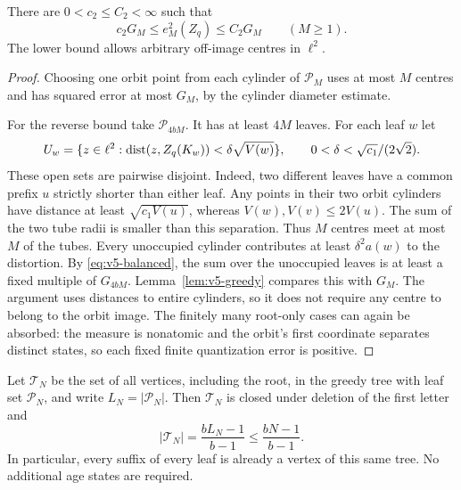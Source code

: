 \begin{lemma}\label{lem:v5-quantization}
There are $0<c_2\le C_2<\infty$ such that
\[
 c_2G_M\le e_M^2(Z_q)\le C_2G_M\qquad(M\ge1).
\]
The lower bound allows arbitrary off-image centres in $\ell^2$.
\end{lemma}

\begin{proof}
Choosing one orbit point from each cylinder of $\mathcal P_M$
uses at most $M$ centres and has squared error at most $G_M$,
by the cylinder diameter estimate.

For the reverse bound take $\mathcal P_{4bM}$. It has at least
$4M$ leaves. For each leaf $w$ let
\[
 U_w=\{z\in\ell^2:\operatorname{dist}(z,Z_q(K_w))<\delta\sqrt{V(w)}\},
 \qquad 0<\delta<\sqrt{c_1}/(2\sqrt2).
\]
These open sets are pairwise disjoint. Indeed, two different leaves
have a common prefix $u$ strictly shorter than either leaf. Any
points in their two orbit cylinders have distance at least
$\sqrt{c_1V(u)}$, whereas $V(w),V(v)\le2V(u)$.
The sum of the two tube radii is smaller than this separation.
Thus $M$ centres meet at most $M$ of the tubes. Every unoccupied
cylinder contributes at least $\delta^2a(w)$ to the distortion.
By \eqref{eq:v5-balanced}, the sum over the unoccupied leaves is
at least a fixed multiple of $G_{4bM}$. Lemma~\ref{lem:v5-greedy}
compares this with $G_M$. The argument uses distances to entire
cylinders, so it does not require any centre to belong to the
orbit image. The finitely many root-only cases can again be
absorbed: the measure is nonatomic and the orbit's first
coordinate separates distinct states, so each fixed finite
quantization error is positive.
\end{proof}

\begin{lemma}\label{lem:v5-suffix}
Let $\mathcal T_N$ be the set of all vertices, including the root,
in the greedy tree with leaf set $\mathcal P_N$, and write
$L_N=|\mathcal P_N|$. Then $\mathcal T_N$ is closed under deletion
of the first letter and
\begin{equation}\label{eq:v5-exact-states}
 |\mathcal T_N|=\frac{bL_N-1}{b-1}\le\frac{bN-1}{b-1}.
\end{equation}
In particular, every suffix of every leaf is already a vertex of
this same tree. No additional age states are required.
\end{lemma}

